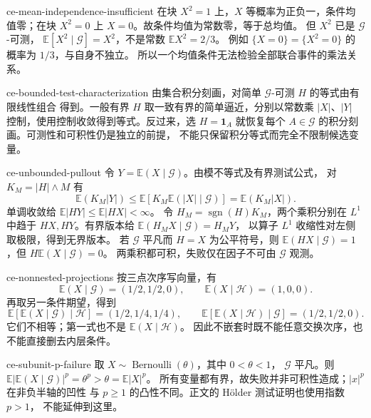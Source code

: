 \begin{solution}{ce-mean-independence-insufficient}
在块 $X^2=1$ 上，$X$ 等概率为正负一，条件均值零；在块 $X^2=0$ 上
$X=0$。故条件均值为常数零，等于总均值。
但 $X^2$ 已是 $\mathcal G$-可测，
$\mathbb E[X^2\mid\mathcal G]=X^2$，不是常数 $\mathbb EX^2=2/3$。
例如 $\{X=0\}=\{X^2=0\}$ 的概率为 $1/3$，与自身不独立。
所以一个均值条件无法检验全部联合事件的乘法关系。
\end{solution}

\begin{solution}{ce-bounded-test-characterization}
由集合积分刻画，对简单 $\mathcal G$-可测 $H$ 的等式由有限线性组合
得到。一般有界 $H$ 取一致有界的简单逼近，分别以常数乘 $|X|$、$|Y|$
控制，使用控制收敛得到等式。反过来，选 $H=\mathbf1_A$ 就恢复每个
$A\in\mathcal G$ 的积分刻画。可测性和可积性仍是独立的前提，
不能只保留积分等式而完全不限制候选变量。
\end{solution}

\begin{solution}{ce-unbounded-pullout}
令 $Y=\mathbb E(X\mid\mathcal G)$。由模不等式及有界测试公式，
对 $K_M=|H|\wedge M$ 有
\[
 \mathbb E(K_M|Y|)
 \le\mathbb E[K_M\mathbb E(|X|\mid\mathcal G)]
 =\mathbb E(K_M|X|).
\]
单调收敛给 $\mathbb E|HY|\le\mathbb E|HX|<\infty$。
令 $H_M=\operatorname{sgn}(H)K_M$，两个乘积分别在 $L^1$ 中趋于
$HX,HY$。有界版本给 $\mathbb E(H_MX\mid\mathcal G)=H_MY$，
以算子 $L^1$ 收缩性对左侧取极限，得到无界版本。
若 $\mathcal G$ 平凡而 $H=X$ 为公平符号，则
$\mathbb E(HX\mid\mathcal G)=1$，但 $H\mathbb E(X\mid\mathcal G)=0$。
两乘积都可积，失败仅在因子不可由 $\mathcal G$ 观测。
\end{solution}

\begin{solution}{ce-nonnested-projections}
按三点次序写向量，有
\[
 \mathbb E(X\mid\mathcal G)=(1/2,1/2,0),\qquad
 \mathbb E(X\mid\mathcal H)=(1,0,0).
\]
再取另一条件期望，得到
\[
 \mathbb E[\mathbb E(X\mid\mathcal G)\mid\mathcal H]=(1/2,1/4,1/4),
 \qquad
 \mathbb E[\mathbb E(X\mid\mathcal H)\mid\mathcal G]=(1/2,1/2,0).
\]
它们不相等；第一式也不是 $\mathbb E(X\mid\mathcal H)$。
因此不嵌套时既不能任意交换次序，也不能直接删去内层条件。
\end{solution}

\begin{solution}{ce-subunit-p-failure}
取 $X\sim\operatorname{Bernoulli}(\theta)$，其中 $0<\theta<1$，
$\mathcal G$ 平凡。则
$\mathbb E|\mathbb E(X\mid\mathcal G)|^p=\theta^p>\theta=\mathbb E|X|^p$。
所有变量都有界，故失败并非可积性造成；$|x|^p$ 在非负半轴的凹性
与 $p\ge1$ 的凸性不同。正文的 Hölder 测试证明也使用指数 $p>1$，
不能延伸到这里。
\end{solution}

